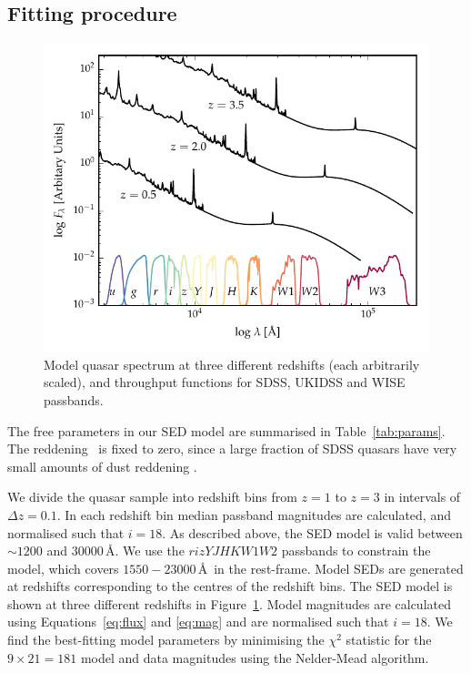 \subsection{Fitting procedure}

\begin{figure}
  \centering
  \includegraphics[width=\textwidth]{figures/chapter05/throughput.pdf}
  \caption[{Model quasar spectrum at three different redshifts, and throughput functions for SDSS, UKIDSS and WISE passbands.}]{Model quasar spectrum at three different redshifts (each arbitrarily scaled), and throughput functions for SDSS, UKIDSS and WISE passbands.}
  \label{fig:filters}
\end{figure}

The free parameters in our SED model are summarised in Table~\ref{tab:params}. 
The reddening \ebv\, is fixed to zero, since a large fraction of SDSS quasars have very small amounts of dust reddening \citep{richards03}. 

We divide the quasar sample into redshift bins from $z=1$ to $z=3$ in intervals of $\Delta z = 0.1$.
In each redshift bin median passband magnitudes are calculated, and normalised such that $i=18$.
As described above, the SED model is valid between $\sim1200$ and $30000$\,\AA.  
We use the $rizYJHKW1W2$ passbands to constrain the model, which covers $1550-23000$\,\AA\, in the rest-frame. 
Model SEDs are generated at redshifts corresponding to the centres of the redshift bins.
The SED model is shown at three different redshifts in Figure~\ref{fig:filters}.
Model magnitudes are calculated using Equations~\ref{eq:flux} and \ref{eq:mag} and are normalised such that $i=18$.
We find the best-fitting model parameters by minimising the $\chi^2$ statistic for the $9 \times 21 = 181$ model and data magnitudes using the Nelder-Mead algorithm. 

